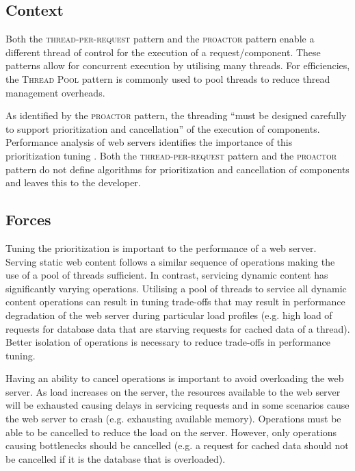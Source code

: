 \documentclass[prodmode]{style/acmlarge}
\begin{document}
\subsection{Context}

Both the \textsc{thread-per-request} pattern \cite{thread-per-request} and the
\textsc{proactor} pattern \cite{proactor} enable a different thread of control
for the execution of a request/component.  These patterns allow for concurrent
execution by utilising many threads.  For efficiencies, the \textsc{Thread Pool}
pattern \cite{thread-per-request} is commonly used to pool threads to reduce
thread management overheads.

As identified by the \textsc{proactor} pattern, the threading ``must be designed
carefully to support prioritization and cancellation'' \cite[p. 8]{proactor} of
the execution of components.  Performance analysis of web servers identifies the
importance of this prioritization tuning
\cite{tuning-important,low-server-footprint,tuning-os-important}.  Both the
\textsc{thread-per-request} pattern and the \textsc{proactor} pattern do not
define algorithms for prioritization and cancellation of components and leaves
this to the developer.


\subsection{Forces}

Tuning the prioritization is important to the performance of a web server.
Serving static web content follows a similar sequence of operations making the
use of a pool of threads sufficient.  In contrast, servicing dynamic content has
significantly varying operations.  Utilising a pool of threads to service all
dynamic content operations can result in tuning trade-offs that may result in
performance degradation of the web server during particular load profiles (e.g.
high load of requests for database data that are starving requests for cached
data of a thread).  Better isolation of operations is necessary to reduce
trade-offs in performance tuning.

Having an ability to cancel operations is important to avoid overloading the web
server.  As load increases on the server, the resources available to the web
server will be exhausted causing delays in servicing requests and in some
scenarios cause the web server to crash (e.g. exhausting available memory). 
Operations must be able to be cancelled to reduce the load on the server. 
However, only operations causing bottlenecks should be cancelled (e.g. a request
for cached data should not be cancelled if it is the database that is
overloaded).
\end{document}
